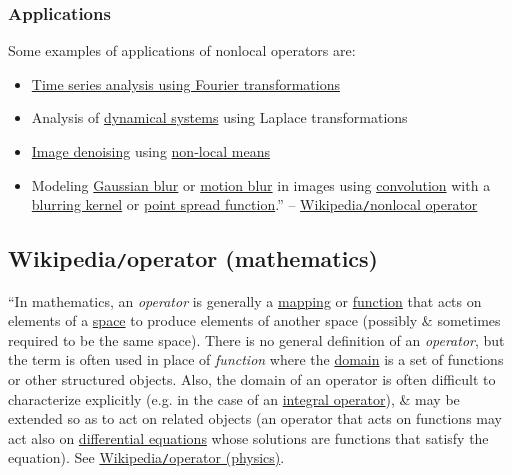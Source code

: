 \documentclass{article}
\begin{document}
\subsubsection{Applications}
Some examples of applications of nonlocal operators are:
\begin{itemize}
	\item \href{https://en.wikipedia.org/wiki/Time_series}{Time series analysis using Fourier transformations}
	\item Analysis of \href{https://en.wikipedia.org/wiki/Dynamical_systems}{dynamical systems} using Laplace transformations
	\item \href{https://en.wikipedia.org/wiki/Image_denoising}{Image denoising} using \href{https://en.wikipedia.org/wiki/Non-local_means}{non-local means}
	\item Modeling \href{https://en.wikipedia.org/wiki/Gaussian_blur}{Gaussian blur} or \href{https://en.wikipedia.org/wiki/Motion_blur}{motion blur} in images using \href{https://en.wikipedia.org/wiki/Convolution}{convolution} with a \href{https://en.wikipedia.org/wiki/Kernel_(image_processing)}{blurring kernel} or \href{https://en.wikipedia.org/wiki/Point_spread_function}{point spread function}.'' -- \href{https://en.wikipedia.org/wiki/Nonlocal_operator}{Wikipedia{\tt/}nonlocal operator}
\end{itemize}


\subsection{Wikipedia{\tt/}operator (mathematics)}
``In mathematics, an {\it operator} is generally a \href{https://en.wikipedia.org/wiki/Map_(mathematics)}{mapping} or \href{https://en.wikipedia.org/wiki/Function_(mathematics)}{function} that acts on elements of a \href{https://en.wikipedia.org/wiki/Space_(mathematics)}{space} to produce elements of another space (possibly \& sometimes required to be the same space). There is no general definition of an {\it operator}, but the term is often used in place of {\it function} where the \href{https://en.wikipedia.org/wiki/Domain_of_a_function}{domain} is a set of functions or other structured objects. Also, the domain of an operator is often difficult to characterize explicitly (e.g. in the case of an \href{https://en.wikipedia.org/wiki/Integral_operator}{integral operator}), \& may be extended so as to act on related objects (an operator that acts on functions may act also on \href{https://en.wikipedia.org/wiki/Differential_equation}{differential equations} whose solutions are functions that satisfy the equation). See \href{https://en.wikipedia.org/wiki/Operator_(physics)}{Wikipedia{\tt/}operator (physics)}.
\end{document}
